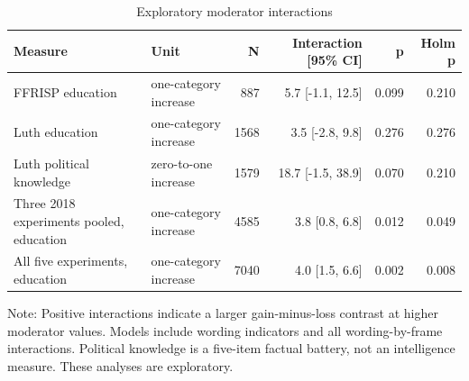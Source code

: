 \begin{table}[H]
\centering
\caption{\label{tab:moderators}Exploratory moderator interactions}
\centering
\fontsize{8}{10}\selectfont
\begin{threeparttable}
\begin{tabular}[t]{llrrrr}
\toprule
Measure & Unit & N & Interaction [95\% CI] & p & Holm p\\
\midrule
FFRISP education & one-category increase & 887 & 5.7 [-1.1, 12.5] & 0.099 & 0.210\\
Luth education & one-category increase & 1568 & 3.5 [-2.8, 9.8] & 0.276 & 0.276\\
Luth political knowledge & zero-to-one increase & 1579 & 18.7 [-1.5, 38.9] & 0.070 & 0.210\\
Three 2018 experiments pooled, education & one-category increase & 4585 & 3.8 [0.8, 6.8] & 0.012 & 0.049\\
All five experiments, education & one-category increase & 7040 & 4.0 [1.5, 6.6] & 0.002 & 0.008\\
\bottomrule
\end{tabular}
\begin{tablenotes}[para]
\item Note: Positive interactions indicate a larger gain-minus-loss contrast at higher moderator values. Models include wording indicators and all wording-by-frame interactions. Political knowledge is a five-item factual battery, not an intelligence measure. These analyses are exploratory.
\end{tablenotes}
\end{threeparttable}
\end{table}
